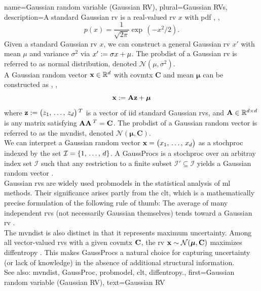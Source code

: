 {name={Gaussian random variable (Gaussian RV)}, 
	plural={Gaussian RVs}, 
	description={A  standard Gaussian \gls{rv} is a 
		real-valued \gls{rv} $x$ with \gls{pdf} \cite{BertsekasProb}, \cite{GrayProbBook}, \cite{papoulis}
		\begin{equation}
			\nonumber
			p(x) = \frac{1}{\sqrt{2\pi}} \exp\,(-x^2/2). 
		\end{equation}
		Given a standard Gaussian \gls{rv} $x$, we can construct a general Gaussian \gls{rv} $x'$ with 
		\gls{mean} $\mu$ and \gls{variance} $\sigma^2$ via $x' := \sigma x + \mu$. The \gls{probdist} of a 
		Gaussian \gls{rv} is referred to as normal distribution, denoted $\mathcal{N}(\mu, \sigma^2)$. 
		\\ 
		A Gaussian random \gls{vector} ${\bf x} \in \mathbb{R}^{d}$ with 
		\gls{covmtx} $\mathbf{C}$ and \gls{mean} ${\bm \mu}$ can be constructed as \cite{GrayProbBook}, \cite{papoulis}, \cite{Lapidoth09}
		\[
		{\bf x} := \mathbf{A} {\bf z} + {\bm \mu}
		\]
		where ${\bf z} := \big( z_{1}, \,\ldots, \,z_{d} \big)\,^{T}$ is a \gls{vector} 
		of \gls{iid} standard Gaussian \glspl{rv}, and ${\bf A} \in \mathbb{R}^{d \times d}$ is any \gls{matrix} satisfying ${\bf A} {\bf A}\,^{T} = {\bf C}$. 
		The \gls{probdist} of a Gaussian random \gls{vector} is referred to as the \gls{mvndist}, 
		denoted $\mathcal{N}({\bm \mu}, \mathbf{C})$.
		\\
		We can interpret a Gaussian random \gls{vector} ${\bf x}=\big(x_{1},\,\ldots,\,x_{d}\big)$ as a \gls{stochproc} 
		indexed by the set $\mathcal{I}=\{1,\,\ldots,\,d\}$. A \glspl{GaussProc} is a 
		\gls{stochproc} over an arbitray index set $\mathcal{I}$ such that any restriction to a finite subset 
		$\mathcal{I}' \subseteq \mathcal{I}$ yields a Gaussian random \gls{vector} \cite{Rasmussen2006Gaussian}.
  		\\
        		Gaussian \glspl{rv} are widely used \glspl{probmodel} in the statistical analysis of 
        		\gls{ml} methods. Their significance arises partly from the \gls{clt}, which is a mathematically 
        		precise formulation of the following rule of thumb: The average of many independent \glspl{rv} 
		(not necessarily Gaussian themselves) tends toward a Gaussian \gls{rv} \cite{ross2013first}.
		\\ 
		The \gls{mvndist} is also distinct in that it represents maximum \gls{uncertainty}. 
		Among all \gls{vector}-valued \glspl{rv} with a given \gls{covmtx} ${\bf C}$, the \gls{rv} ${\bf x} \sim \mathcal{N}({\bm \mu}, \mathbf{C})$ 
		maximizes \gls{diffentropy} \cite[Th. 8.6.5]{coverthomas}. This makes \glspl{GaussProc} a 
		natural choice for capturing \gls{uncertainty} (or lack of knowledge) in the absence of additional 
		structural information.
		\\ 
		See also: \gls{mvndist}, \gls{GaussProc}, \gls{probmodel}, \gls{clt}, \gls{diffentropy}.},
	first={Gaussian random variable (Gaussian RV)},
	text={Gaussian RV}
}
	
